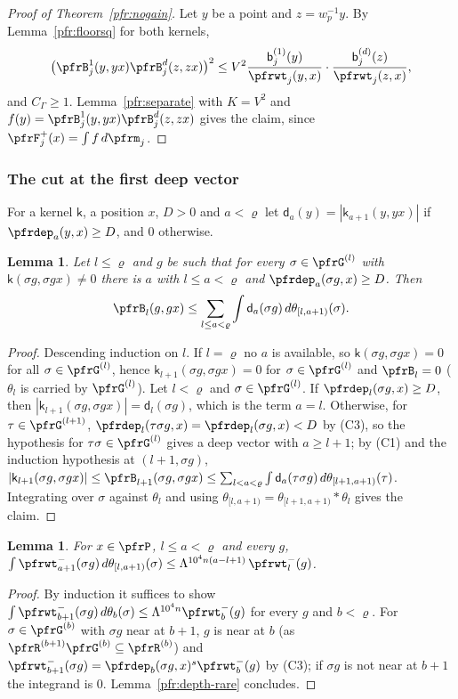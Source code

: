 \documentclass[10pt]{amsart}
\newtheorem{lemma}[theorem]{Lemma}
\theoremstyle{definition}
\theoremstyle{remark}
\begin{document}
\begin{proof}[Proof of Theorem~\ref{pfr:nogain}]
Let $y$ be a point and $z=w_p^{-1}y$. By Lemma~\ref{pfr:floorsq} for both kernels,
\[
\bigl(\pfrB^1_j(y,yx)\pfrB^{d}_j(z,zx)\bigr)^2\le V^2\frac{\mathsf b^{(1)}_j(y)}{\pfrwt_j(y,x)}\cdot\frac{\mathsf
b^{(d)}_j(z)}{\pfrwt_j(z,x)},
\]
and $C_\Gamma\ge1$. Lemma~\ref{pfr:separate} with $K=V^2$ and $f(y)=\pfrB^1_j(y,yx)\pfrB^d_j(z,zx)$ gives the
claim, since $\pfrF^+_j(x)=\int f\,d\pfrm_j$.
\end{proof}

\subsubsection*{The cut at the first deep vector}
For a kernel $\mathsf k$, a position $x$, $D>0$ and $a<\varrho$ let $\mathsf d_a(y)=|\mathsf k_{a+1}(y,
yx)|$ if $\pfrdep_a(y,x)\ge D$, and $0$ otherwise.

\begin{lemma}\label{pfr:cut}
Let $l\le\varrho$ and $g$ be such that for every $\sigma\in\pfrG^{(l)}$ with $\mathsf k(\sigma g,\sigma gx)\ne0$
there is $a$ with $l\le a<\varrho$ and $\pfrdep_a(\sigma g,x)\ge D$. Then
\[
\pfrB_l(g,gx)\le\sum_{l\le a<\varrho}\int\mathsf d_a(\sigma g)\,d\theta_{[l,a+1)}(\sigma).
\]
\end{lemma}
\begin{proof}
Descending induction on $l$. If $l=\varrho$ no $a$ is available, so $\mathsf k(\sigma g,\sigma gx)=0$ for
all $\sigma\in\pfrG^{(l)}$, hence $\mathsf k_{l+1}(\sigma g,\sigma gx)=0$ for $\sigma\in\pfrG^{(l)}$ and
$\pfrB_l=0$ ($\theta_l$ is carried by $\pfrG^{(l)}$). Let $l<\varrho$ and $\sigma\in\pfrG^{(l)}$. If
$\pfrdep_l(\sigma g,x)\ge D$, then $|\mathsf k_{l+1}(\sigma g,\sigma gx)|=\mathsf d_l(\sigma g)$, which is the
term $a=l$. Otherwise, for $\tau\in\pfrG^{(l+1)}$, $\pfrdep_l(\tau\sigma g,x)=\pfrdep_l(\sigma g,x)<D$ by (C3),
so the hypothesis for $\tau\sigma\in\pfrG^{(l)}$ gives a deep vector with $a\ge l+1$; by (C1) and the
induction hypothesis at $(l+1,\sigma g)$,
$|\mathsf k_{l+1}(\sigma g,\sigma gx)|\le\pfrB_{l+1}(\sigma g,\sigma gx)\le\sum_{l<a<\varrho}\int\mathsf
d_a(\tau\sigma g)\,d\theta_{[l+1,a+1)}(\tau)$. Integrating over $\sigma$ against $\theta_l$ and using
$\theta_{[l,a+1)}=\theta_{[l+1,a+1)}*\theta_l$ gives the claim.
\end{proof}

\begin{lemma}\label{pfr:invweight-floors}
For $x\in\pfrP$, $l\le a<\varrho$ and every $g$,
$\int\pfrwt^-_{a+1}(\sigma g)\,d\theta_{[l,a+1)}(\sigma)\le\Lambda^{10^4n(a-l+1)}\,\pfrwt^-_l(g)$.
\end{lemma}
\begin{proof}
By induction it suffices to show $\int\pfrwt^-_{b+1}(\sigma g)\,d\theta_b(\sigma)\le\Lambda^{10^4n}\pfrwt^-_b(g)$
for every $g$ and $b<\varrho$. For $\sigma\in\pfrG^{(b)}$ with $\sigma g$ near at $b+1$, $g$ is near at $b$
(as $\pfrR^{(b+1)}\pfrG^{(b)}\subseteq\pfrR^{(b)}$) and $\pfrwt^-_{b+1}(\sigma g)=\pfrdep_b(\sigma
g,x)^{s}\pfrwt^-_b(g)$ by (C3); if $\sigma g$ is not near at $b+1$ the integrand is $0$. Lemma~\ref{pfr:depth-rare}
concludes.
\end{proof}
\end{document}
